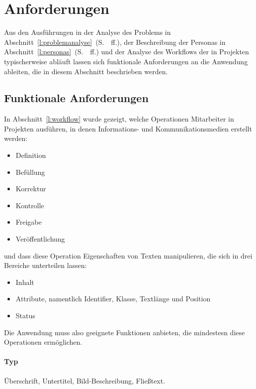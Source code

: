 \section{Anforderungen}\label{l:anforderungen}

Aus den Ausführungen in der Analyse des Problems in Abschnitt~\ref{l:problemanalyse}~(S.~\pageref{l:problemanalyse}~ff.), der Beschreibung der Personas in Abschnitt~\ref{l:personas}~(S.~\pageref{l:personas}~ff.) und der Analyse des Workflows der in Projekten typischerweise abläuft lassen sich funktionale Anforderungen an die Anwendung ableiten, die in diesem Abschnitt beschrieben werden. 

\subsection{Funktionale Anforderungen}

\begin{samepage}
In Abschnitt~\ref{l:workflow} wurde gezeigt, welche Operationen Mitarbeiter in Projekten ausführen, in denen Informations- und Kommunikationsmedien erstellt werden:

\begin{itemize}\itemsep -5pt
\item Definition
\item Befüllung
\item Korrektur
\item Kontrolle
\item Freigabe
\item Veröffentlichung
\end{itemize}
\end{samepage}

\begin{samepage}
und dass diese Operation Eigenschaften von Texten manipulieren, die sich in drei Bereiche unterteilen lassen:

\begin{itemize}\itemsep -5pt
\item Inhalt
\item Attribute, namentlich Identifier, Klasse, Textlänge und Position
\item Status
\end{itemize}
\end{samepage}

Die Anwendung muss also geeignete Funktionen anbieten, die mindestesn diese Operationen ermöglichen.

\TODO

\paragraph{Typ} Überschrift, Untertitel, Bild-Beschreibung, Fließtext.

